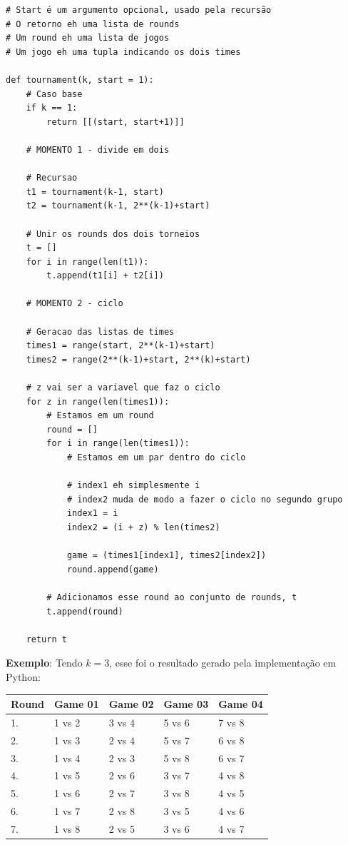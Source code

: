 \documentclass{article}
\begin{document}
{\color{ogreen}
\begin{verbatim}
# Start é um argumento opcional, usado pela recursão
# O retorno eh uma lista de rounds
# Um round eh uma lista de jogos
# Um jogo eh uma tupla indicando os dois times

def tournament(k, start = 1):
    # Caso base
    if k == 1:
        return [[(start, start+1)]]

    # MOMENTO 1 - divide em dois
    
    # Recursao
    t1 = tournament(k-1, start)
    t2 = tournament(k-1, 2**(k-1)+start)

    # Unir os rounds dos dois torneios
    t = []
    for i in range(len(t1)):
        t.append(t1[i] + t2[i])

    # MOMENTO 2 - ciclo
    
    # Geracao das listas de times
    times1 = range(start, 2**(k-1)+start)
    times2 = range(2**(k-1)+start, 2**(k)+start)
    
    # z vai ser a variavel que faz o ciclo
    for z in range(len(times1)):
        # Estamos em um round
        round = []
        for i in range(len(times1)):
            # Estamos em um par dentro do ciclo
            
            # index1 eh simplesmente i
            # index2 muda de modo a fazer o ciclo no segundo grupo
            index1 = i
            index2 = (i + z) % len(times2)

            game = (times1[index1], times2[index2])
            round.append(game)

        # Adicionamos esse round ao conjunto de rounds, t
        t.append(round)

    return t
\end{verbatim}
}

\pagebreak

\textbf{Exemplo}: Tendo $k = 3$, esse foi o resultado gerado pela implementação em Python:\\

\begin{table}[H]
\centering
\begin{tabular}{l|l|l|l|l}
Round & Game 01 & Game 02 & Game 03 & Game 04\\\hline
1.& 1 vs 2 & 3 vs 4 & 5 vs 6 & 7 vs 8\\
2.& 1 vs 3 & 2 vs 4 & 5 vs 7 & 6 vs 8\\
3.& 1 vs 4 & 2 vs 3 & 5 vs 8 & 6 vs 7\\
4.& 1 vs 5 & 2 vs 6 & 3 vs 7 & 4 vs 8\\
5.& 1 vs 6 & 2 vs 7 & 3 vs 8 & 4 vs 5\\
6.& 1 vs 7 & 2 vs 8 & 3 vs 5 & 4 vs 6\\
7.& 1 vs 8 & 2 vs 5 & 3 vs 6 & 4 vs 7\\
\end{tabular}
\end{table}
\end{document}
